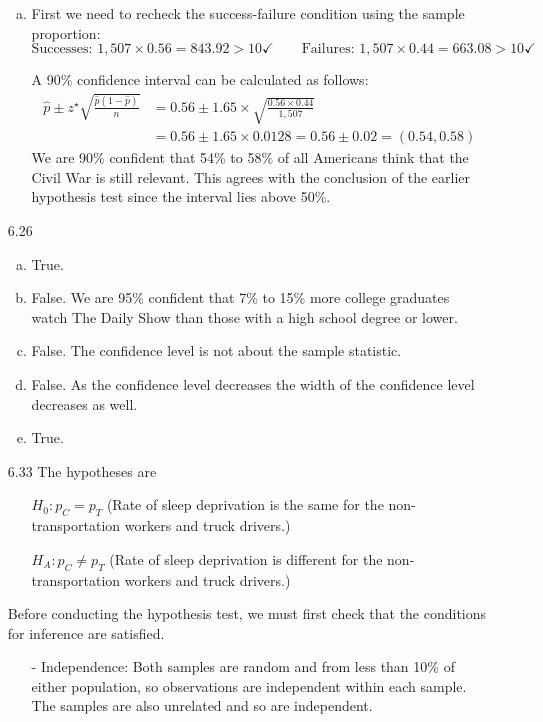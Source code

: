 \documentclass[11pt]{article}
\begin{document}
\begin{enumerate}
\begin{enumerate}[(a)]
\item First we need to recheck the success-failure condition using the sample proportion:
\[ \text{Successes: } 1,507 \times  0.56 = 843.92 > 10 \checkmark \qquad \text{Failures: } 1,507 \times  0.44 = 663.08 > 10 \checkmark \]

A 90\% confidence interval can be calculated as follows:
\begin{align*}
\hat{p} \pm z^{\star} \sqrt{\frac{\hat{p} (1 - \hat{p})}{n}} &= 0.56 \pm 1.65 \times  \sqrt{\frac{0.56 \times  0.44}{1,507}} \\
&= 0.56 \pm 1.65 \times  0.0128 = 0.56 \pm 0.02 = (0.54, 0.58)
\end{align*}
We are 90\% confident that 54\% to 58\% of all Americans think that the Civil War is still relevant. This agrees with the conclusion of the earlier hypothesis test since the interval lies above 50\%.
\end{enumerate}

%

\item[6.26]
\begin{enumerate}[(a)]
\item True.
\item False. We are  95\% confident that 7\% to 15\% more college graduates watch The Daily Show than those with a high school degree or lower.
\item False. The confidence level is not about the sample statistic.
\item False. As the confidence level decreases the width of the confidence level decreases as well.
\item True.
\end{enumerate}

%

\item[6.33]
The hypotheses are
\begin{itemize}
\item[] $H_0: p_C = p_T$ (Rate of sleep deprivation is the same for the non-transportation workers and truck drivers.)
\item[] $H_A: p _C \ne p_T$ (Rate of sleep deprivation is different for the non-transportation workers and truck drivers.)
\end{itemize}

Before conducting the hypothesis test, we must first check that the conditions for inference are satisfied.
\begin{itemize}
\item[-] Independence: Both samples are random and from less than 10\% of either population, so observations are independent within each sample. The samples are also unrelated and so are independent.


\end{itemize}
\end{enumerate}
\end{document}
